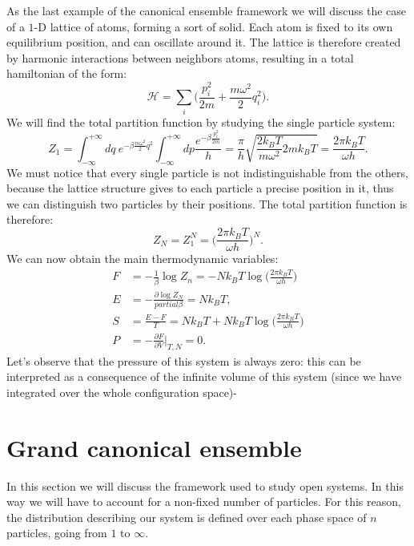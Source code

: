 \begin{example}[1-D solid]
    As the last example of the canonical ensemble framework we will discuss the case of a $1$-D lattice of atoms, forming a sort of solid. Each atom is fixed to its own equilibrium position, and can oscillate around it. The lattice is therefore created by harmonic interactions between neighbors atoms, resulting in a total hamiltonian of the form:
    \begin{equation*}
        \mathcal{H} =\sum_{i}\bigg(\frac{p_i^2}{2m}+\frac{m\omega^2}{2}q_i^2\bigg).
    \end{equation*}
    We will find the total partition function by studying the single particle system:
    \begin{equation*}
        Z_1=\int_{-\infty}^{+\infty}dq\ e^{-\beta\frac{m\omega^2}{2}q^2} \int_{-\infty}^{+\infty}dp\frac{e^{-\beta\frac{p_i^2}{2m}}}{h}=\frac{\pi}{h}\sqrt{\frac{2k_BT}{m\omega^2}2mk_BT}=\frac{2\pi k_BT}{\omega h}. 
    \end{equation*}
    We must notice that every single particle is not indistinguishable from the others, because the lattice structure gives to each particle a precise position in it, thus we can distinguish two particles by their positions. The total partition function is therefore:
    \begin{equation*}
        Z_N=Z_1^N=\bigg(\frac{2\pi k_BT}{\omega h}\bigg)^N.
    \end{equation*}
    We can now obtain the main thermodynamic variables:
    \begin{align*}
        F&=-\frac{1}{\beta}\log Z_n=-Nk_BT\log\bigg(\frac{2\pi k_BT}{\omega h}\bigg)\\
        E&=-\frac{\partial\log Z_N}{partial\beta}=Nk_BT,\\
        S&=\frac{E-F}{T}=Nk_BT+Nk_BT\log\bigg(\frac{2\pi k_BT}{\omega h}\bigg)\\
        P&=-\frac{\partial F}{\partial V}\bigg|_{T,N}=0.
    \end{align*}
    Let's observe that the pressure of this system is always zero: this can be interpreted as a consequence of the infinite volume of this system (since we have integrated over the whole configuration space)-
\end{example}
\section{Grand canonical ensemble}
In this section we will discuss the framework used to study open systems. In this way we will have to account for a non-fixed number of particles. For this reason, the distribution describing our system is defined over each phase space of $n$ particles, going from $1$ to $\infty$.\\

